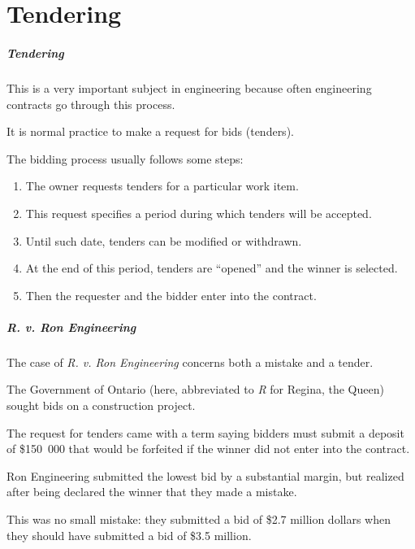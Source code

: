 \part{Tendering}

\begin{frame}
\partpage
\end{frame}


\begin{frame}
\frametitle{Tendering}

This is a very important subject in engineering because often engineering contracts go through this process.

It is normal practice to make a request for bids (\alert{tenders}).

The bidding process usually follows some steps:

\begin{enumerate}
	\item The owner requests tenders for a particular work item.
	\item This request specifies a period during which tenders will be accepted.
	\item Until such date, tenders can be modified or withdrawn.
	\item At the end of this period, tenders are ``opened'' and the winner is selected.
	\item Then the requester and the bidder enter into the contract.
\end{enumerate}

\end{frame}



\begin{frame}
\frametitle{\textit{R. v. Ron Engineering}}

The case of \textit{R. v. Ron Engineering} concerns both a mistake and a tender.

The Government of Ontario (here, abbreviated to \textit{R} for Regina, the Queen) sought bids on a construction project.

The request for tenders came with a term saying bidders must submit a deposit of \$150~000 that would be forfeited if the winner did not enter into the contract.

Ron Engineering submitted the lowest bid by a substantial margin, but realized after being declared the winner that they made a mistake.

This was no small mistake: they submitted a bid of \$2.7 million dollars when they should have submitted a bid of \$3.5 million.

\end{frame}



